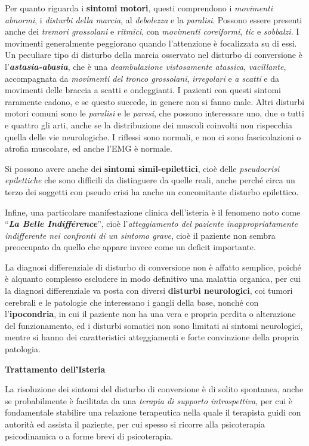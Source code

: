 \documentclass[]{article}
\begin{document}
Per quanto riguarda i \textbf{sintomi motori}, questi comprendono i
\emph{movimenti abnormi}, i \emph{disturbi della marcia}, al
\emph{debolezza} e la \emph{paralisi}. Possono essere presenti anche dei
\emph{tremori grossolani} e \emph{ritmici}, con \emph{movimenti
coreiformi}, \emph{tic} e \emph{sobbalzi}. I movimenti generalmente
peggiorano quando l'attenzione è focalizzata su di essi. Un peculiare
tipo di disturbo della marcia osservato nel disturbo di conversione è
l'\textbf{\emph{astasia-abasia}}, che è una \emph{deambulazione
vistosamente atassica}, \emph{vacillante}, accompagnata da
\emph{movimenti del tronco grossolani}, \emph{irregolari} e \emph{a
scatti} e da movimenti delle braccia a scatti e ondeggianti. I pazienti
con questi sintomi raramente cadono, e se questo succede, in genere non
si fanno male. Altri disturbi motori comuni sono le \emph{paralisi} e le
\emph{paresi}, che possono interessare uno, due o tutti e quattro gli
arti, anche se la distribuzione dei muscoli coinvolti non rispecchia
quella delle vie neurologiche. I riflessi sono normali, e non ci sono
fascicolazioni o atrofia muscolare, ed anche l'EMG è normale.

Si possono avere anche dei \textbf{sintomi simil-epilettici}, cioè delle
\emph{pseudocrisi epilettiche} che sono difficili da distinguere da
quelle reali, anche perché circa un terzo dei soggetti con pseudo crisi
ha anche un concomitante disturbo epilettico.

Infine, una particolare manifestazione clinica dell'isteria è il
fenomeno noto come ``\textbf{\emph{La Belle Indifférence}}'', cioè
l'\emph{atteggiamento del paziente inappropriatamente indifferente nei
confronti di un sintomo grave}, cioè il paziente non sembra preoccupato
da quello che appare invece come un deficit importante.

La diagnosi differenziale di disturbo di conversione non è affatto
semplice, poiché è alquanto complesso escludere in modo definitivo una
malattia organica, per cui la diagnosi differenziale va posta con
diversi \textbf{disturbi neurologici}, coi tumori cerebrali e le
patologie che interessano i gangli della base, nonché con
l'\textbf{ipocondria}, in cui il paziente non ha una vera e propria
perdita o alterazione del funzionamento, ed i disturbi somatici non sono
limitati ai sintomi neurologici, mentre si hanno dei caratteristici
atteggiamenti e forte convinzione della propria patologia.

\textbf{Trattamento dell'Isteria}

La risoluzione dei sintomi del disturbo di conversione è di solito
spontanea, anche se probabilmente è facilitata da una \emph{terapia di
supporto introspettiva}, per cui è fondamentale stabilire una relazione
terapeutica nella quale il terapista guidi con autorità ed assista il
paziente, per cui spesso si ricorre alla psicoterapia psicodinamica o a
forme brevi di psicoterapia.
\end{document}
